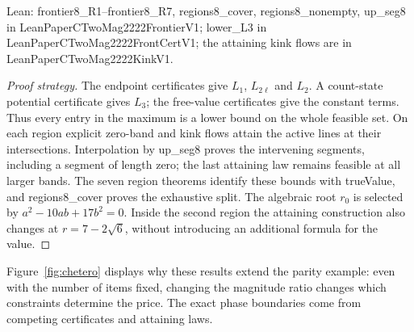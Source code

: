 \documentclass[conference]{IEEEtran}
\theoremstyle{definition}
\newcommand{\lean}[1]{\textsf{\footnotesize #1}}
\newcommand{\leanbox}[1]{%
  \par\vspace{2pt}\noindent
  {\raggedright\footnotesize\textsf{Lean: #1}\par}\vspace{2pt}}
\begin{document}
\leanbox{\lean{frontier8\_R1}--\lean{frontier8\_R7}, \lean{regions8\_cover},
\lean{regions8\_nonempty}, \lean{up\_seg8} in \lean{LeanPaperCTwoMag2222FrontierV1};
\lean{lower\_L3} in \lean{LeanPaperCTwoMag2222FrontCertV1}; the attaining kink flows are in
\lean{LeanPaperCTwoMag2222KinkV1}.}
\begin{proof}[Proof strategy]
The endpoint certificates give $L_1$, $L_{2\ell}$ and $L_2$. A count-state potential
certificate gives $L_3$; the free-value certificates give the constant terms. Thus every
entry in the maximum is a lower bound on the whole feasible set. On each region explicit
zero-band and kink flows attain the active lines at their intersections. Interpolation by
\lean{up\_seg8} proves the intervening segments, including a segment of length zero; the
last attaining law remains feasible at all larger bands. The seven region theorems identify
these bounds with \lean{trueValue}, and \lean{regions8\_cover} proves the exhaustive split.
The algebraic root $r_0$ is selected by $a^2-10ab+17b^2=0$. Inside the second region the
attaining construction also changes at $r=7-2\sqrt6$, without introducing an additional
formula for the value.
\end{proof}

Figure~\ref{fig:chetero} displays why these results extend the parity example: even with
the number of items fixed, changing the magnitude ratio changes which constraints determine
the price. The exact phase boundaries come from competing certificates and attaining laws.
\end{document}
